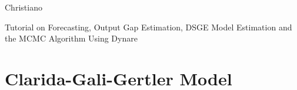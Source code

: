 







Christiano

\begin{center}
Tutorial on Forecasting, Output Gap Estimation, DSGE Model Estimation and
the MCMC Algorithm Using Dynare
\end{center}

\section{Clarida-Gali-Gertler Model}

